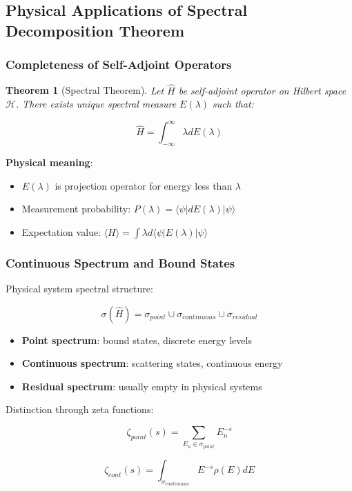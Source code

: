 \documentclass[12pt,a4paper]{article}
\newtheorem{theorem}{Theorem}[section]
\begin{document}
\subsection{Physical Applications of Spectral Decomposition Theorem}

\subsubsection{Completeness of Self-Adjoint Operators}

\begin{theorem}[Spectral Theorem]
Let $\hat{H}$ be self-adjoint operator on Hilbert space $\mathcal{H}$. There exists unique spectral measure $E(\lambda)$ such that:

$$\hat{H} = \int_{-\infty}^{\infty} \lambda dE(\lambda)$$
\end{theorem}

\textbf{Physical meaning}:
\begin{itemize}
\item $E(\lambda)$ is projection operator for energy less than $\lambda$
\item Measurement probability: $P(\lambda) = \langle\psi|dE(\lambda)|\psi\rangle$
\item Expectation value: $\langle H \rangle = \int \lambda d\langle\psi|E(\lambda)|\psi\rangle$
\end{itemize}

\subsubsection{Continuous Spectrum and Bound States}

Physical system spectral structure:

$$\sigma(\hat{H}) = \sigma_{point} \cup \sigma_{continuous} \cup \sigma_{residual}$$

\begin{itemize}
\item \textbf{Point spectrum}: bound states, discrete energy levels
\item \textbf{Continuous spectrum}: scattering states, continuous energy
\item \textbf{Residual spectrum}: usually empty in physical systems
\end{itemize}

Distinction through zeta functions:

$$\zeta_{point}(s) = \sum_{E_n \in \sigma_{point}} E_n^{-s}$$

$$\zeta_{cont}(s) = \int_{\sigma_{continuous}} E^{-s} \rho(E) dE$$
\end{document}
